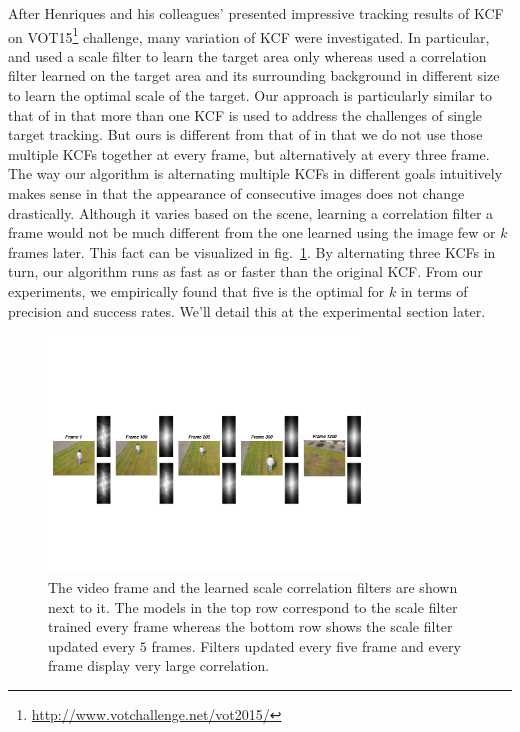 \documentclass{bmvc2k}
\begin{document}
After Henriques and his colleagues' presented impressive tracking
results of KCF \cite{henriques2015high} on VOT15\footnote{\url{http://www.votchallenge.net/vot2015/}} challenge,
 many variation of KCF were investigated. In particular, \cite{ma2015long} and
\cite{danelljan2014accurate} used a scale filter to learn the target
area only whereas \cite{li2014scale, bibi2015multi, tang2015multi}
used a correlation filter learned on the target area and its
surrounding background in different size to learn the optimal scale of
the target. Our approach is particularly similar to that of
\cite{ma2015long} in that more than one KCF is used to address the
challenges of single target tracking. But ours is different from that
of \cite{ma2015long} in that we do not use those multiple KCFs together
at every frame, but alternatively at every three frame. The way our
algorithm is alternating multiple KCFs in different goals intuitively
makes sense in that the appearance of consecutive images does not
change drastically. Although it varies based on the scene, learning a
correlation filter a frame would not be much different from the one
learned using the image few or $k$ frames later. This fact can be visualized in fig.~\ref{fig:Filters_Comparison}.
By alternating three KCFs in turn, our algorithm runs as fast as or faster than the
original KCF. From our experiments, we empirically found that five is
the optimal for $k$ in terms of precision and success rates. We'll
detail this at the experimental section later.

\begin{figure}[!h]
\centering
\includegraphics[width=0.75\textwidth]{figures/LearnedFilterComparison.pdf}
\caption{The video frame and the learned scale correlation filters are shown next to it. 
The models in the top row correspond to the scale filter trained every frame whereas the bottom row shows the scale filter updated every $5$ frames. 
Filters updated every five frame and every frame display very large correlation.}
\label{fig:Filters_Comparison}
\end{figure}
\end{document}
